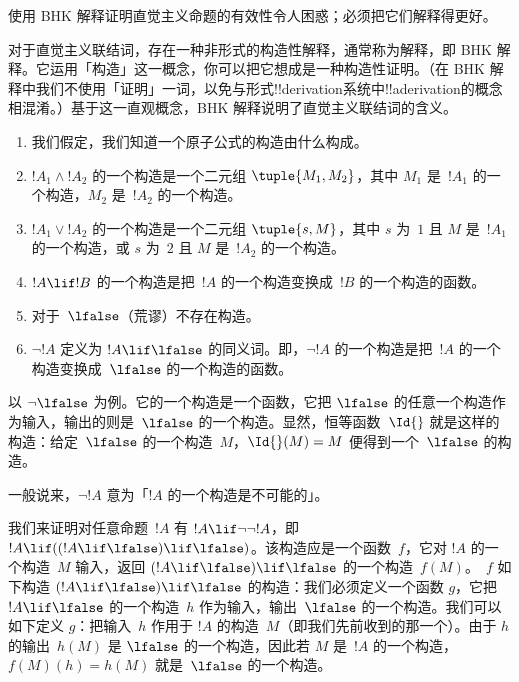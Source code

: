 \documentclass[../../../include/open-logic-section]{subfiles}
\begin{document}


\begin{editorial}
  使用 BHK 解释证明直觉主义命题的有效性令人困惑；必须把它们解释得更好。
\end{editorial}

对于直觉主义联结词，存在一种非形式的构造性解释，通常称为解释，即 BHK 解释。它运用「构造」这一概念，你可以把它想成是一种构造性证明。（在 BHK 解释中我们不使用「证明」一词，以免与形式!!{derivation}系统中!!a{derivation}的概念相混淆。）基于这一直观概念，BHK 解释说明了直觉主义联结词的含义。

\begin{enumerate}
\item 我们假定，我们知道一个原子公式的构造由什么构成。
\item $!A_1 \land !A_2$ 的一个构造是一个二元组 $\tuple{M_1, M_2}$，其中 $M_1$ 是~$!A_1$ 的一个构造，$M_2$ 是~$!A_2$ 的一个构造。
\item $!A_1 \lor !A_2$ 的一个构造是一个二元组 $\tuple{s, M}$，其中 $s$ 为~$1$ 且 $M$ 是~$!A_1$ 的一个构造，或 $s$ 为~$2$ 且 $M$ 是~$!A_2$ 的一个构造。
\item $!A \lif !B$ 的一个构造是把~$!A$ 的一个构造变换成~$!B$ 的一个构造的函数。
\item 对于~$\lfalse$（荒谬）不存在构造。
\item $\lnot !A$ 定义为 $!A \lif \lfalse$ 的同义词。即，$\lnot !A$ 的一个构造是把~$!A$ 的一个构造变换成~$\lfalse$ 的一个构造的函数。
\end{enumerate}

\begin{ex}
以 $\lnot \lfalse$ 为例。它的一个构造是一个函数，它把 $\lfalse$ 的任意一个构造作为输入，输出的则是~$\lfalse$ 的一个构造。显然，恒等函数~$\Id{}$ 就是这样的构造：给定~$\lfalse$ 的一个构造~$M$，$\Id{}(M) = M$ 便得到一个~$\lfalse$ 的构造。
\end{ex}

一般说来，$\lnot !A$ 意为「$!A$ 的一个构造是不可能的」。

\begin{ex}
我们来证明对任意命题~$!A$ 有 $!A \lif \lnot \lnot !A$，即 $!A \lif ((!A \lif \lfalse) \lif \lfalse)$。该构造应是一个函数~$f$，它对 $!A$ 的一个构造~$M$ 输入，返回 $(!A \lif \lfalse) \lif \lfalse$ 的一个构造~$f(M)$。~$f$ 如下构造 $(!A \lif \lfalse) \lif \lfalse$ 的构造：我们必须定义一个函数 $g$，它把 $!A \lif \lfalse$ 的一个构造~$h$ 作为输入，输出~$\lfalse$ 的一个构造。我们可以如下定义 $g$：把输入~$h$ 作用于 $!A$ 的构造~$M$（即我们先前收到的那一个）。由于 $h$ 的输出~$h(M)$ 是 $\lfalse$ 的一个构造，因此若 $M$ 是~$!A$ 的一个构造，$f(M)(h) = h(M)$ 就是~$\lfalse$ 的一个构造。
\end{ex}
\end{document}
